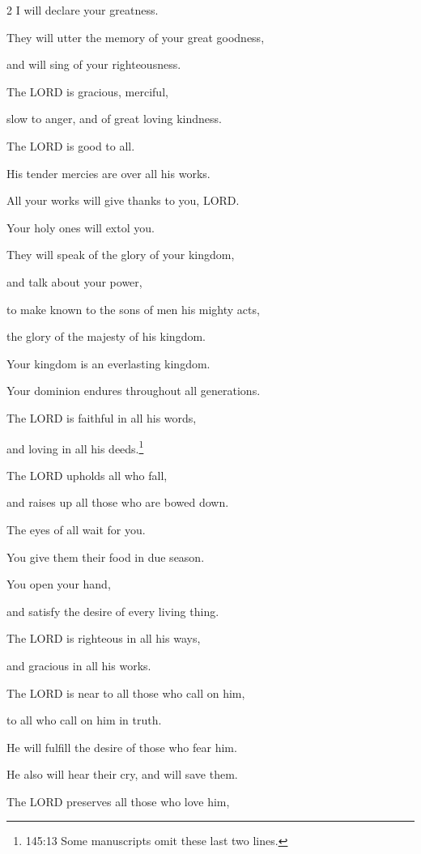 \begin{multicols}{2}
	I will declare your greatness.
	
	
	\myverse{}They will utter the memory of your great goodness,
	
	and will sing of your righteousness.
	
	
	\myverse{}The LORD is gracious, merciful,
	
	slow to anger, and of great loving kindness.
	
	
	\myverse{}The LORD is good to all.
	
	His tender mercies are over all his works.
	
	
	\myverse{}All your works will give thanks to you, LORD.
	
	Your holy ones will extol you.
	
	
	\myverse{}They will speak of the glory of your kingdom,
	
	and talk about your power,
	
	
	\myverse{}to make known to the sons of men his mighty acts,
	
	the glory of the majesty of his kingdom.
	
	
	\myverse{}Your kingdom is an everlasting kingdom.
	
	Your dominion endures throughout all generations.
	
	The LORD is faithful in all his words,
	
	and loving in all his deeds.\footnote{145:13 Some manuscripts omit these last two lines.}
	
	
	\myverse{}The LORD upholds all who fall,
	
	and raises up all those who are bowed down.
	
	
	\myverse{}The eyes of all wait for you.
	
	You give them their food in due season.
	
	
	\myverse{}You open your hand,
	
	and satisfy the desire of every living thing.
	
	
	\myverse{}The LORD is righteous in all his ways,
	
	and gracious in all his works.
	
	
	\myverse{}The LORD is near to all those who call on him,
	
	to all who call on him in truth.
	
	
	\myverse{}He will fulfill the desire of those who fear him.
	
	He also will hear their cry, and will save them.
	
	
	\myverse{}The LORD preserves all those who love him,
	

\end{multicols}

